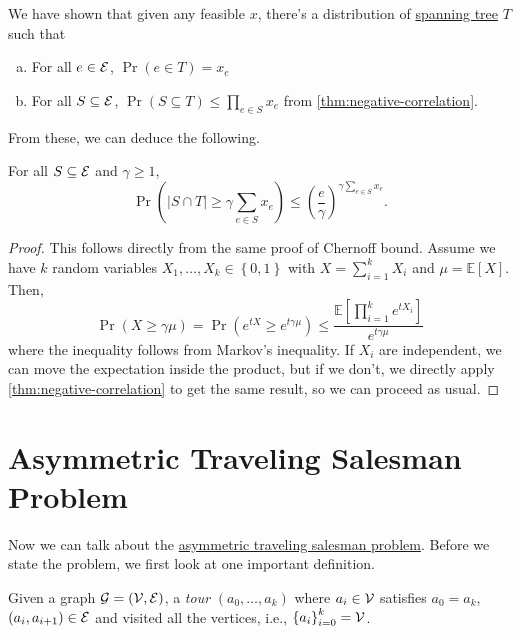 \begin{prev}
	We have shown that given any feasible \(x\), there's a distribution of \hyperref[def:spanning-tree]{spanning tree} \(T\) such that
	\begin{enumerate}[(a)]
		\item For all \(e\in \mathcal{\MakeUppercase{e}} \), \(\Pr(e\in T) = x_e\)
		\item For all \(S \subseteq \mathcal{\MakeUppercase{e}} \), \(\Pr(S \subseteq T) \leq \prod_{e\in S} x_e\) from \autoref{thm:negative-correlation}.
	\end{enumerate}
\end{prev}

From these, we can deduce the following.
\begin{theorem}
	For all \(S \subseteq \mathcal{\MakeUppercase{e}} \) and \(\gamma \geq 1\),
	\[
		\Pr(\left\vert S \cap T \right\vert \geq \gamma \sum_{e\in S} x_e) \leq \left( \frac{e}{\gamma } \right) ^{\gamma \sum_{e\in S} x_e}.
	\]
\end{theorem}
\begin{proof}
	This follows directly from the same proof of Chernoff bound. Assume we have \(k\) random variables \(X_1, \ldots, X_k \in \left\{ 0, 1 \right\} \) with \(X = \sum_{i=1} ^k X_i\) and \(\mu = \mathbb{E}\left[X \right]\). Then,
	\[
		\Pr(X \geq \gamma \mu )= \Pr(e^{tX} \geq e^{t \gamma \mu }) \leq \frac{\mathbb{E}\left[\prod_{i=1}^{k} e^{tX_i} \right] }{e^{t \gamma \mu }}
	\]
	where the inequality follows from Markov's inequality. If \(X_i\) are independent, we can move the expectation inside the product, but if we don't, we directly apply \autoref{thm:negative-correlation} to get the same result, so we can proceed as usual.
\end{proof}

\section{Asymmetric Traveling Salesman Problem}

Now we can talk about the \hyperref[prb:ATSP]{asymmetric traveling salesman problem}. Before we state the problem, we first look at one important definition.

\begin{definition}[Tour]\label{def:tour}
	Given a graph \(\mathcal{\MakeUppercase{g}} =(\mathcal{\MakeUppercase{v}} , \mathcal{\MakeUppercase{e}} )\), a \emph{tour} \((a_0, \ldots , a_k)\) where \(a_i\in \mathcal{\MakeUppercase{v}} \) satisfies \(a_0 = a_k\), \((a_i, a_{i+1})\in \mathcal{\MakeUppercase{e}} \) and visited all the vertices, i.e., \(\left\{ a_i \right\} _{i=0}^k = \mathcal{\MakeUppercase{v}} \).
\end{definition}

